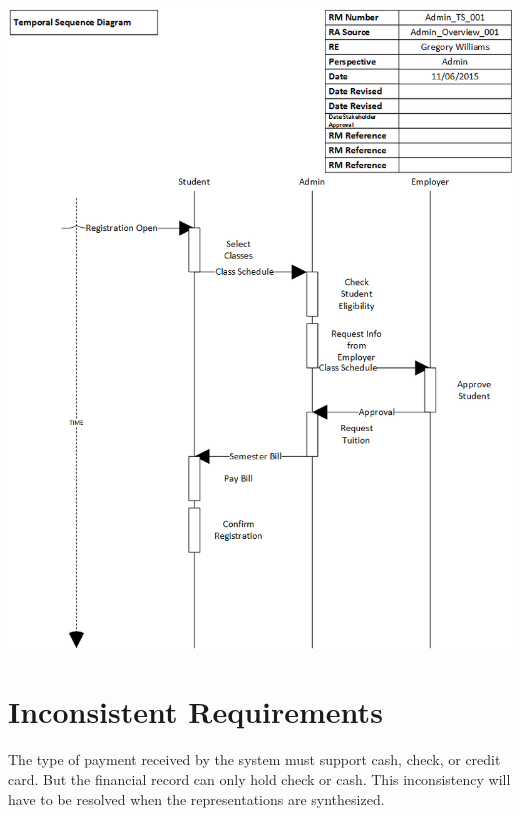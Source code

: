 \documentclass{article}
\begin{document}
	\\
	\includegraphics[width=\textwidth]{TemporalSequence}
	\\
	
	\section*{Inconsistent Requirements}
	The type of payment received by the system must support cash, check, or credit card. But the financial record can only hold check or cash. This inconsistency will have to be resolved when the representations are synthesized.
\end{document}
